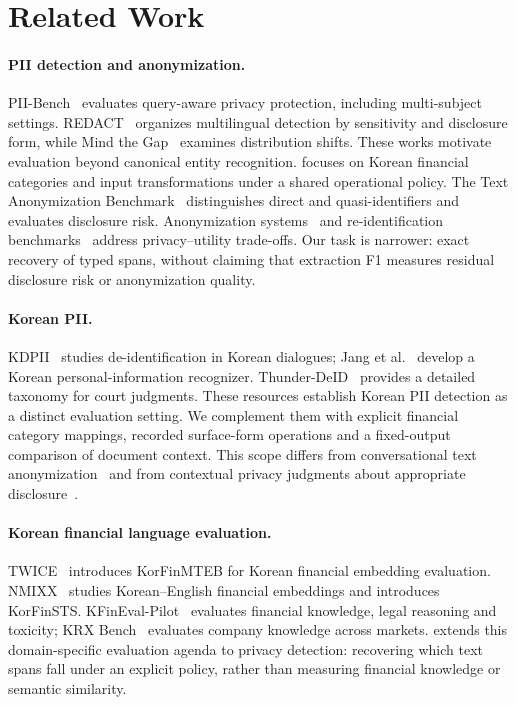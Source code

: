 \section{Related Work}
\label{sec:related}

\paragraph{PII detection and anonymization.}
PII-Bench~\cite{shen2025piibench} evaluates query-aware privacy protection, including multi-subject settings. REDACT~\cite{vats2026redact} organizes multilingual detection by sensitivity and disclosure form, while Mind the Gap~\cite{zafar2026mindthegap} examines distribution shifts. These works motivate evaluation beyond canonical entity recognition. \kiii{} focuses on Korean financial categories and input transformations under a shared operational policy. The Text Anonymization Benchmark~\cite{pilan2022tab} distinguishes direct and quasi-identifiers and evaluates disclosure risk. Anonymization systems~\cite{staab2025anonymizers,yang2025rupta} and re-identification benchmarks~\cite{krco2026ratbench} address privacy--utility trade-offs. Our task is narrower: exact recovery of typed spans, without claiming that extraction F1 measures residual disclosure risk or anonymization quality.

\paragraph{Korean PII.}
KDPII~\cite{fei2024kdpii} studies de-identification in Korean dialogues; Jang et al.~\cite{jang2024koreanpiiner} develop a Korean personal-information recognizer. Thunder-DeID~\cite{hahm2025thunderdeid} provides a detailed taxonomy for court judgments. These resources establish Korean PII detection as a distinct evaluation setting. We complement them with explicit financial category mappings, recorded surface-form operations and a fixed-output comparison of document context. This scope differs from conversational text anonymization~\cite{albanese2026anonymous} and from contextual privacy judgments about appropriate disclosure~\cite{mireshghallah2024confaide,shao2024privacylens}.

\paragraph{Korean financial language evaluation.}
TWICE~\cite{hwang2025twice} introduces KorFinMTEB for Korean financial embedding evaluation. NMIXX~\cite{lee2025nmixx} studies Korean--English financial embeddings and introduces KorFinSTS. KFinEval-Pilot~\cite{hwang2025kfineval} evaluates financial knowledge, legal reasoning and toxicity; KRX Bench~\cite{son2024krx} evaluates company knowledge across markets. \kiii{} extends this domain-specific evaluation agenda to privacy detection: recovering which text spans fall under an explicit policy, rather than measuring financial knowledge or semantic similarity.

